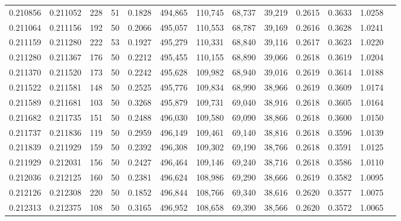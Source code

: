 \begin{tabular}{rrrrrrrrrrrrr}
0.210856 & 0.211052 &   228 &  51 &                                     0.1828 & 494,865 & 110,745 &  68,737 &  39,219 & 0.2615 & 0.3633 & 1.0258 \\
0.211064 & 0.211156 &   192 &  50 &                                     0.2066 & 495,057 & 110,553 &  68,787 &  39,169 & 0.2616 & 0.3628 & 1.0241 \\
0.211159 & 0.211280 &   222 &  53 &                                     0.1927 & 495,279 & 110,331 &  68,840 &  39,116 & 0.2617 & 0.3623 & 1.0220 \\
0.211280 & 0.211367 &   176 &  50 &                                     0.2212 & 495,455 & 110,155 &  68,890 &  39,066 & 0.2618 & 0.3619 & 1.0204 \\
0.211370 & 0.211520 &   173 &  50 &                                     0.2242 & 495,628 & 109,982 &  68,940 &  39,016 & 0.2619 & 0.3614 & 1.0188 \\
0.211522 & 0.211581 &   148 &  50 &                                     0.2525 & 495,776 & 109,834 &  68,990 &  38,966 & 0.2619 & 0.3609 & 1.0174 \\
0.211589 & 0.211681 &   103 &  50 &                                     0.3268 & 495,879 & 109,731 &  69,040 &  38,916 & 0.2618 & 0.3605 & 1.0164 \\
0.211682 & 0.211735 &   151 &  50 &                                     0.2488 & 496,030 & 109,580 &  69,090 &  38,866 & 0.2618 & 0.3600 & 1.0150 \\
0.211737 & 0.211836 &   119 &  50 &                                     0.2959 & 496,149 & 109,461 &  69,140 &  38,816 & 0.2618 & 0.3596 & 1.0139 \\
0.211839 & 0.211929 &   159 &  50 &                                     0.2392 & 496,308 & 109,302 &  69,190 &  38,766 & 0.2618 & 0.3591 & 1.0125 \\
0.211929 & 0.212031 &   156 &  50 &                                     0.2427 & 496,464 & 109,146 &  69,240 &  38,716 & 0.2618 & 0.3586 & 1.0110 \\
0.212036 & 0.212125 &   160 &  50 &                                     0.2381 & 496,624 & 108,986 &  69,290 &  38,666 & 0.2619 & 0.3582 & 1.0095 \\
0.212126 & 0.212308 &   220 &  50 &                                     0.1852 & 496,844 & 108,766 &  69,340 &  38,616 & 0.2620 & 0.3577 & 1.0075 \\
0.212313 & 0.212375 &   108 &  50 &                                     0.3165 & 496,952 & 108,658 &  69,390 &  38,566 & 0.2620 & 0.3572 & 1.0065 \\

\end{tabular}

